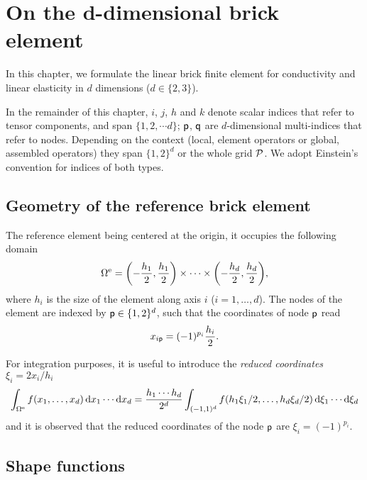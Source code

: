 \chapter{On the d-dimensional brick element}
\label{cha:20210930054817}

In this chapter, we formulate the linear brick finite element for conductivity
and linear elasticity in \(d\) dimensions (\(d\in\{2, 3\}\)).

\begin{remark}
  In the remainder of this chapter, \(i\), \(j\), \(h\) and \(k\) denote scalar
  indices that refer to tensor components, and span \(\{1, 2, \cdots d\}\);
  \(\mathsf{ p}\), \(\mathsf{q}\) are \(d\)-dimensional multi-indices that refer
  to nodes. Depending on the context (local, element operators or global,
  assembled operators) they span \(\{1, 2\}^d\) or the whole grid
  \(\mathcal{P}\). We adopt Einstein's convention for indices of both types.
\end{remark}

\section{Geometry of the reference brick element}

The reference element being centered at the origin, it occupies the following
domain
\begin{equation}
  \Omega^{\mathrm{e}}=\biggl(-\frac{h_1}2, \frac{h_1}2\biggr)\times\cdots
  \times\biggl(-\frac{h_d}2, \frac{h_d}2\biggr),
\end{equation}
where \(h_i\) is the size of the element along axis \(i\) (\(i=1, \dots,
d\)). The nodes of the element are indexed by \(\mathsf{p}\in\{1, 2\}^d\), such
that the coordinates of node \(\mathsf{p}\) read
\begin{equation}
  x_{i\mathsf{p}}=(-1)^{p_i}\frac{h_i}2.
\end{equation}

For integration purposes, it is useful to introduce the \emph{reduced
  coordinates} \(\xi_i=2x_i/h_i\)
\begin{equation}
  \int_{\Omega^{\mathrm{e}}}f(x_1, \ldots, x_d)\,\mathrm d x_1\cdots\mathrm d x_d
  =\frac{h_1\cdots h_d}{2^d}\int_{(-1, 1)^d}f(h_1\xi_1/2, \ldots, h_d\xi_d/2)
  \,\mathrm d\xi_1\cdots\mathrm d\xi_d
\end{equation}
and it is observed that the reduced coordinates of the node \(\mathsf{p}\) are
\(\xi_i=(-1)^{p_i}\).

\section{Shape functions}
\label{sec:20210930054720}

